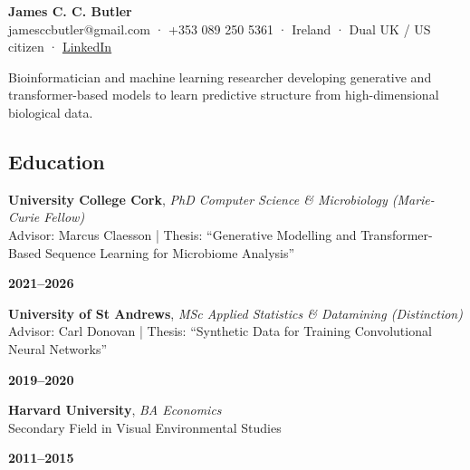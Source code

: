 \documentclass[
]{article}
\author{}
\date{}
\begin{document}
\begin{center}
{\LARGE \textbf{James C. C. Butler}}\\
\vspace{0.6em}
jamesccbutler@gmail.com \;·\; +353 089 250 5361 \;·\; Ireland \;·\; Dual UK / US citizen \;·\; \href{https://linkedin.com/in/jamescbutler}{LinkedIn}
\end{center}

\vspace{0.5em}

Bioinformatician and machine learning researcher developing generative
and transformer-based models to learn predictive structure from
high-dimensional biological data.

\subsection{Education}\label{education}

\noindent
\begin{minipage}[t]{0.85\textwidth}
\textbf{University College Cork}, \emph{PhD Computer Science \& Microbiology (Marie-Curie Fellow)}\\
Advisor: Marcus Claesson \;|\; Thesis: ``Generative Modelling and Transformer-Based Sequence Learning for Microbiome Analysis''
\end{minipage}%
\hfill
\begin{minipage}[t]{0.15\textwidth}
\raggedleft \textbf{2021--2026}
\end{minipage}

\vspace{0.6em}

\noindent
\begin{minipage}[t]{0.85\textwidth}
\textbf{University of St Andrews}, \emph{MSc Applied Statistics \& Datamining (Distinction)}\\
Advisor: Carl Donovan \;|\; Thesis: ``Synthetic Data for Training Convolutional Neural Networks''
\end{minipage}%
\hfill
\begin{minipage}[t]{0.15\textwidth}
\raggedleft \textbf{2019--2020}
\end{minipage}

\vspace{0.6em}

\noindent
\begin{minipage}[t]{0.85\textwidth}
\textbf{Harvard University}, \emph{BA Economics}\\
Secondary Field in Visual Environmental Studies
\end{minipage}%
\hfill
\begin{minipage}[t]{0.15\textwidth}
\raggedleft \textbf{2011--2015}
\end{minipage}
\end{document}
